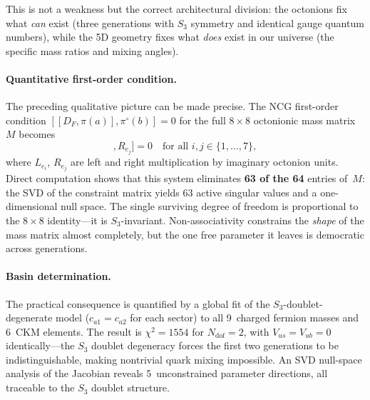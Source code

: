 This is not a weakness but the correct architectural division: the octonions fix what \emph{can} exist (three generations with $S_3$ symmetry and identical gauge quantum numbers), while the 5D geometry fixes what \emph{does} exist in our universe (the specific mass ratios and mixing angles).

\paragraph{Quantitative first-order condition.}
The preceding qualitative picture can be made precise. The NCG first-order condition $[[D_F, \pi(a)], \pi^\circ(b)] = 0$ for the full $8 \times 8$ octonionic mass matrix $M$ becomes
\begin{equation}
  [[M, L_{e_i}], R_{e_j}] = 0 \quad \text{for all } i,j \in \{1,\ldots,7\},
  \label{eq:4-fo-full}
\end{equation}
where $L_{e_i}$, $R_{e_j}$ are left and right multiplication by imaginary octonion units. Direct computation shows that this system eliminates \textbf{63 of the 64} entries of~$M$: the SVD of the constraint matrix yields 63 active singular values and a one-dimensional null space. The single surviving degree of freedom is proportional to the $8 \times 8$ identity---it is $S_3$-invariant. Non-associativity constrains the \emph{shape} of the mass matrix almost completely, but the one free parameter it leaves is democratic across generations.

\paragraph{Basin determination.}
The practical consequence is quantified by a global fit of the $S_3$-doublet-degenerate model ($c_{a1} = c_{a2}$ for each sector) to all 9~charged fermion masses and 6~CKM elements. The result is $\chi^2 = 1554$ for $N_{\mathrm{dof}} = 2$, with $V_{us} = V_{ub} = 0$ identically---the $S_3$ doublet degeneracy forces the first two generations to be indistinguishable, making nontrivial quark mixing impossible. An SVD null-space analysis of the Jacobian reveals 5~unconstrained parameter directions, all traceable to the $S_3$ doublet structure.

